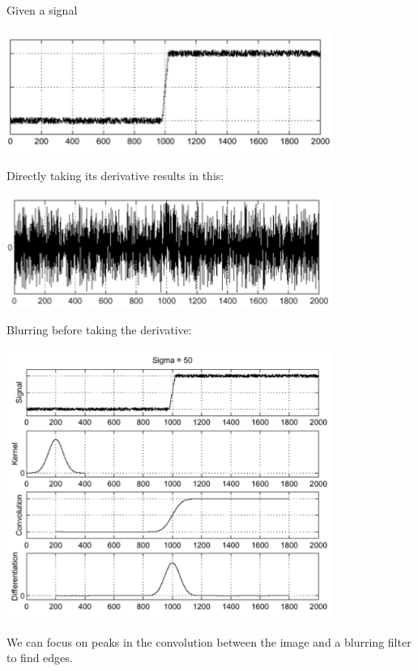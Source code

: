 \documentclass{article}
\begin{document}
Given a signal

\begin{center}
\includegraphics[width=0.8\textwidth]{images/signal.png}
\end{center}

Directly taking its derivative results in this:

\begin{center}
\includegraphics[width=0.8\textwidth]{images/derivative.png}
\end{center}

Blurring before taking the derivative:

\begin{center}
\includegraphics[width=0.8\textwidth]{images/blurring_before_derivation.png}
\end{center}

We can focus on peaks in the convolution between the image and a blurring filter to find edges.
\end{document}
